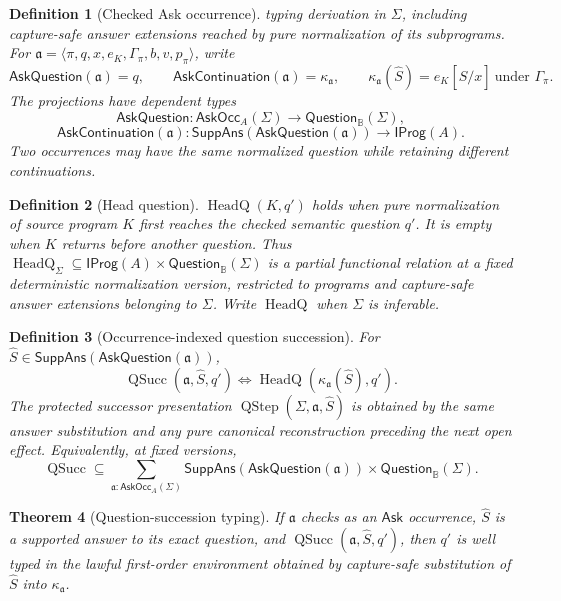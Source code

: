 \documentclass[11pt,oneside]{article}
\newtheorem{definition}{Definition}[section]
\newtheorem{theorem}[definition]{Theorem}
\newcommand{\B}{\mathbb B}
\newcommand{\QSucc}{\operatorname{QSucc}}
\newcommand{\QStep}{\operatorname{QStep}}
\newcommand{\HeadQ}{\operatorname{HeadQ}}
\newcommand{\AskRef}{\mathfrak a}
\begin{document}
\begin{definition}[Checked Ask occurrence]
typing derivation in \(\Sigma\), including capture-safe answer extensions reached by pure
normalization of its subprograms.  For
\(\AskRef=\langle\pi,q,x,e_K,\Gamma_\pi,b,v,p_\pi\rangle\), write
\[
\mathsf{AskQuestion}(\AskRef)=q,
\qquad
\mathsf{AskContinuation}(\AskRef)=\kappa_{\AskRef},
\qquad
\kappa_{\AskRef}(\widehat S)=e_K[\widehat S/x]\ \text{under }\Gamma_\pi.
\]
The projections have dependent types
\[
\mathsf{AskQuestion}:\mathsf{AskOcc}_A(\Sigma)\to\mathsf{Question}_{\B}(\Sigma),
\]
\[
\mathsf{AskContinuation}(\AskRef):
\mathsf{SuppAns}(\mathsf{AskQuestion}(\AskRef))\to\mathsf{IProg}(A).
\]
Two occurrences may have the same normalized question while retaining different continuations.
\end{definition}

\begin{definition}[Head question]\label{def:head-question}
\(\HeadQ(K,q')\) holds when pure normalization of source program \(K\) first reaches the checked
semantic question \(q'\).  It is empty when \(K\) returns before another question.
Thus
\(\HeadQ_{\Sigma}\subseteq\mathsf{IProg}(A)\times\mathsf{Question}_{\B}(\Sigma)\) is a partial
functional relation at a fixed deterministic normalization version, restricted to programs and
capture-safe answer extensions belonging to \(\Sigma\).  Write \(\HeadQ\) when \(\Sigma\) is
inferable.
\end{definition}

\begin{definition}[Occurrence-indexed question succession]\label{def:qsucc-occurrence}
For \(\widehat S\in\mathsf{SuppAns}(\mathsf{AskQuestion}(\AskRef))\),
\[
\boxed{
\QSucc(\AskRef,\widehat S,q')
\iff
\HeadQ(\kappa_{\AskRef}(\widehat S),q').
}
\]
The protected successor presentation
\(\QStep(\Sigma,\AskRef,\widehat S)\) is obtained by the same answer substitution and any pure canonical
reconstruction preceding the next open effect.
Equivalently, at fixed versions,
\[
\QSucc\subseteq
\sum_{\AskRef:\mathsf{AskOcc}_A(\Sigma)}
\mathsf{SuppAns}(\mathsf{AskQuestion}(\AskRef))
\times\mathsf{Question}_{\B}(\Sigma).
\]
\end{definition}

\begin{theorem}[Question-succession typing]\label{thm:qsucc-occurrence-typing}
If \(\AskRef\) checks as an \(\mathsf{Ask}\) occurrence, \(\widehat S\) is a supported answer to its
exact question, and \(\QSucc(\AskRef,\widehat S,q')\), then \(q'\) is well typed in the lawful
first-order environment obtained by capture-safe substitution of \(\widehat S\) into
\(\kappa_{\AskRef}\).
\end{theorem}
\end{document}
